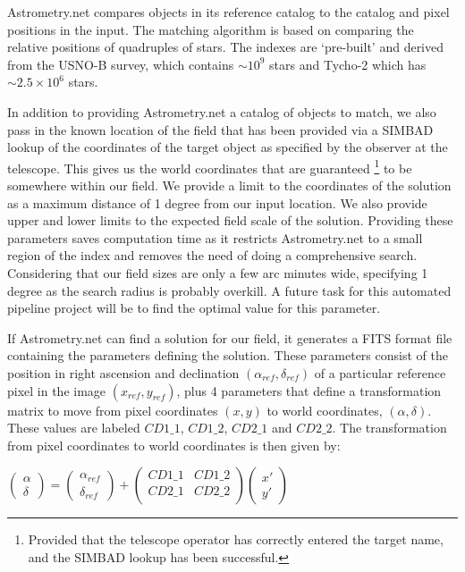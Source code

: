 Astrometry.net compares objects in its reference catalog to the catalog and pixel positions in the input. The matching algorithm is based on comparing the relative positions of quadruples of stars. The indexes are `pre-built' and derived from the USNO-B survey, which contains $\sim10^9$ stars and Tycho-2 which has $\sim2.5\times10^6$ stars. 

In addition to providing Astrometry.net a catalog of objects to match, we also pass in the known location of the field that has been provided via a SIMBAD lookup of the coordinates of the target object as specified by the observer at the telescope. This gives us the world coordinates that are guaranteed \footnote{Provided that the telescope operator has correctly entered the target name, and the SIMBAD lookup has been successful.} to be somewhere within our field. We provide a limit to the coordinates of the solution as a maximum distance of 1 degree from our input location. We also provide upper and lower limits to the expected field scale of the solution. Providing these parameters saves computation time as it restricts Astrometry.net to a small region of the index and removes the need of doing a comprehensive search. Considering that our field sizes are only a few arc minutes wide, specifying 1 degree as the search radius is probably overkill. A future task for this automated pipeline project will be to find the optimal value for this parameter.

If Astrometry.net can find a solution for our field, it generates a FITS format file containing the parameters defining the solution. These parameters consist of the position in right ascension and declination $(\alpha_{ref}, \delta_{ref})$ of a particular reference pixel in the image $(x_{ref}, y_{ref})$, plus 4 parameters that define a transformation matrix to move from pixel coordinates $(x, y)$ to world coordinates, $(\alpha, \delta)$. These values are labeled $CD1\_1$, $CD1\_2$, $CD2\_1$ and $CD2\_2$. The transformation from pixel coordinates to world coordinates is then given by: 

$\left(\begin{array}{c} \alpha \\ \delta \end{array} \right) = \left(\begin{array}{c} \alpha_{ref} \\ \delta_{ref} \end{array} \right) + 
\left(\begin{array}{cc}  CD1\_1 & CD1\_2 \\ CD2\_1  & CD2\_2 \\ \end{array}\right) 
\left(\begin{array}{c} x' \\ y' \end{array} \right)$

